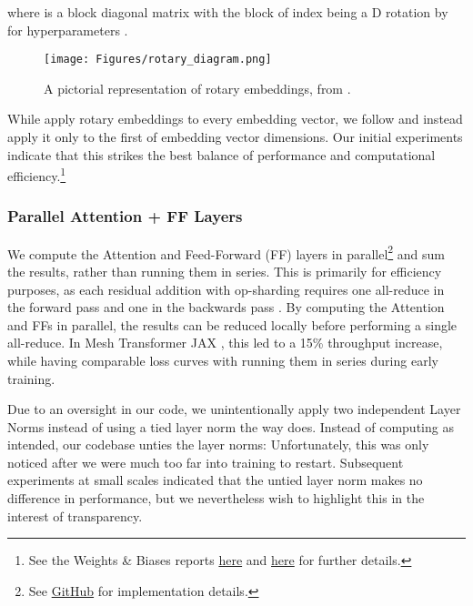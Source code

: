\documentclass[11pt]{article}
\begin{document}
where  is a  block diagonal matrix with the block of index  being a D rotation by  for hyperparameters . 

\begin{figure}[th]
    \centering
    \texttt{[image: Figures/rotary\_diagram.png]}
    \caption{A pictorial representation of rotary embeddings, from \citet{su2021roformer}.}
    \label{fig:rotary}
\end{figure}

While \citet{su2021roformer} apply rotary embeddings to every embedding vector, we follow \citet{gpt-j} and instead apply it only to the first  of embedding vector dimensions. Our initial experiments indicate that this strikes the best balance of performance and computational efficiency.\footnote{See the Weights \& Biases reports \href{https://wandb.ai/eleutherai/neox/reports/Partial-Rotary-Tests-v2--Vmlldzo2MjE4MTQ}{here} and \href{https://wandb.ai/lucidrains/x-transformers-experiments/reports/partial-rotary--Vmlldzo2MjAyODY?accessToken=f657029yibaln2vseli6egxxwykhpeuedeuvcnmmdgn4i6d5b1r30it3mp0gw0k5}{here} for further details.}


\subsubsection{Parallel Attention + FF Layers}
\label{subsubsec:parallel-ff}
We compute the Attention and Feed-Forward (FF) layers in parallel\footnote{See \href{https://github.com/EleutherAI/gpt-neox/blob/ac3d8087f1762213880523893a52329d66d2d1a9/megatron/model/transformer.py\#L593}{GitHub} for implementation details.} and sum the results, rather than running them in series. This is primarily for efficiency purposes, as each residual addition with op-sharding requires one all-reduce in the forward pass and one in the backwards pass \citep{shoeybi2020megatronlm}. By computing the Attention and FFs in parallel, the results can be reduced locally before performing a single all-reduce. In Mesh Transformer JAX \citep{mesh-transformer-jax}, this led to a 15\% throughput increase, while having comparable loss curves with running them in series during early training.

Due to an oversight in our code, we unintentionally apply two independent Layer Norms instead of using a tied layer norm the way \citet{gpt-j} does. Instead of computing  as intended, our codebase unties the layer norms:
 Unfortunately, this was only noticed after we were much too far into training to restart. Subsequent experiments at small scales indicated that the untied layer norm makes no difference in performance, but we nevertheless wish to highlight this in the interest of transparency.
\end{document}
